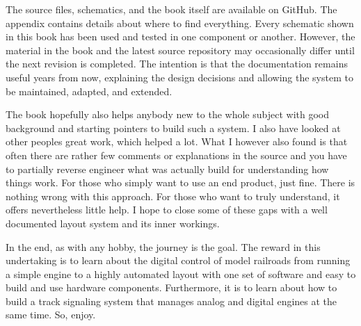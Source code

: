 The source files, schematics, and the book itself are available on GitHub. The appendix contains details about where to find everything. Every schematic shown in this book has been used and tested in one component or another. However, the material in the book and the latest source repository may occasionally differ until the next revision is completed. The intention is that the documentation remains useful years from now, explaining the design decisions and allowing the system to be maintained, adapted, and extended.

The book hopefully also helps anybody new to the whole subject with good background and starting pointers to build such a system. I also have looked at other peoples great work, which helped a lot. What I however also found is that often there are rather few comments or explanations in the source and you have to partially reverse engineer what was actually build for understanding how things work. For those who simply want to use an end product, just fine. There is nothing wrong with this approach. For those who want to truly understand, it offers nevertheless little help. I hope to close some of these gaps with a well documented layout system and its inner workings.

In the end, as with any hobby, the journey is the goal. The reward in this undertaking is to learn about the digital control of model railroads from running a simple engine to a highly automated layout with one set of software and easy to build and use hardware components. Furthermore, it is to learn about how to build a track signaling system that manages analog and digital engines at the same time. So, enjoy.


